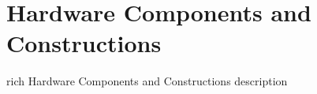 \section{Hardware Components and Constructions}

rich Hardware Components and Constructions description

